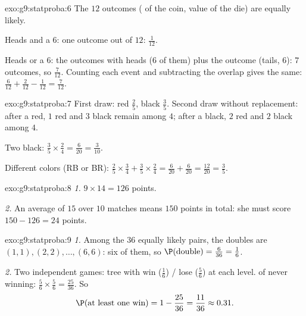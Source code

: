 \begin{solution}{exo:g9:statproba:6}
The $12$ outcomes ( of the coin, value of the die) are equally
likely.

Heads and a $6$: one outcome out of $12$: $\frac{1}{12}$.

Heads or a $6$: the outcomes with heads ($6$ of them) plus the outcome
(tails, $6$): $7$ outcomes, so $\frac{7}{12}$. Counting each event and
subtracting the overlap gives the same:
$\frac{6}{12} + \frac{2}{12} - \frac{1}{12} = \frac{7}{12}$.
\end{solution}

\begin{solution}{exo:g9:statproba:7}
First draw: red $\frac25$, black $\frac35$. Second draw without
replacement: after a red, $1$ red and $3$ black remain among $4$; after
a black, $2$ red and $2$ black among $4$.

Two black: $\frac35 \times \frac24 = \frac{6}{20} = \frac{3}{10}$.

Different colors (RB or BR):
$\frac25 \times \frac34 + \frac35 \times \frac24
= \frac{6}{20} + \frac{6}{20} = \frac{12}{20} = \frac35$.
\end{solution}

\begin{solution}{exo:g9:statproba:8}
\emph{1.} $9 \times 14 = 126$ points.

\emph{2.} An average of $15$ over $10$ matches means $150$ points in
total: she must score $150 - 126 = 24$ points.
\end{solution}

\begin{solution}{exo:g9:statproba:9}
\emph{1.} Among the $36$ equally likely pairs, the doubles are
$(1,1), (2,2), \dots, (6,6)$: six of them, so
$\P(\text{double}) = \frac{6}{36} = \frac16$.

\emph{2.} Two independent games: tree with win ($\frac16$) / lose
($\frac56$) at each level.  of never winning:
$\frac56 \times \frac56 = \frac{25}{36}$. So
\[
\P(\text{at least one win}) = 1 - \frac{25}{36} = \frac{11}{36}
\approx 0.31 .
\]
\end{solution}

